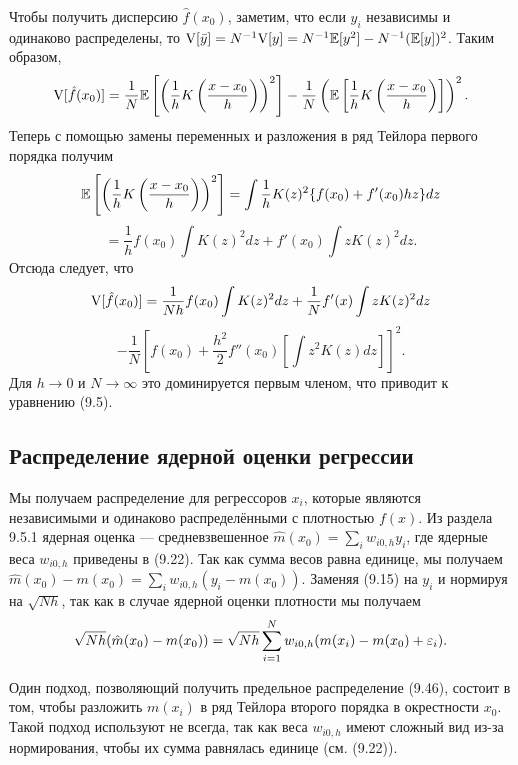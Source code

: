 Чтобы получить дисперсию $\hat{f}(x_0)$, заметим, что если $y_i$ независимы и одинаково распределены, то $\mathrm{V}[\bar{y}] = N^{-1}\mathrm{V}[y] = N^{-1}\mathbb{E}[y^2] - N^{-1}(\mathbb{E}[y])^2$. Таким образом,
\[
\mathrm{V}[\hat{f}(x_0)] = \frac{1}{N} \mathbb{E}\left[ \left( \frac{1}{h} K \left( \frac{x - x_0}{h} \right) \right)^2 \right] - \frac{1}{N} \left( \mathbb{E} \left[ \frac{1}{h} K \left( \frac{x - x_0}{h} \right) \right] \right)^2.
\]
Теперь с помощью замены переменных и разложения в ряд Тейлора первого порядка получим
\[
\mathbb{E}\left[ \left( \frac{1}{h} K \left( \frac{x - x_0}{h} \right) \right)^2 \right] = \int \frac{1}{h} K(z)^2 \{f(x_0) + f'(x_0)hz\}dz
\]
\[
= \frac{1}{h}f(x_0)\int K(z)^2dz + f'(x_0)\int zK(z)^2dz.
\]
Отсюда следует, что 
\[
\mathrm{V}[\hat{f}(x_0)] = \frac{1}{Nh} f(x_0) \int K(z)^2 dz + \frac{1}{N} f'(x) \int zK(z)^2dz
\]
\[
- \frac{1}{N} \left[f(x_0) + \frac{h^2}{2} f''(x_0)\left[ \int z^2 K(z)dz\right]\right]^2.
\]
Для $h \rightarrow 0$ и $N \rightarrow \infty$ это доминируется первым членом, что приводит к уравнению (9.5).

\subsection{Распределение ядерной оценки регрессии}

Мы получаем распределение для регрессоров $x_i$, которые являются независимыми и одинаково распределёнными с плотностью $f(x)$. Из раздела 9.5.1 ядерная оценка --- средневзвешенное $\hat{m}(x_0) = \sum_i w_{i0,h}y_i$, где ядерные веса $w_{i0,h}$ приведены в (9.22). Так как сумма весов равна единице, мы получаем $\hat{m}(x_0) - m(x_0) = \sum_i w_{i0,h}(y_i - m(x_0))$. Заменяя (9.15) на $y_i$ и нормируя на $\sqrt{Nh}$, так как в случае ядерной оценки плотности мы получаем
\begin{equation}
\sqrt{Nh}(\hat{m}(x_0) - m(x_0)) = \sqrt{Nh} \sum_{i=1}^N w_{i0,h}(m(x_i) - m(x_0) + \varepsilon_i).
\end{equation}

Один подход, позволяющий получить предельное распределение (9.46), состоит в том, чтобы разложить $m(x_i)$ в ряд Тейлора второго порядка в окрестности $x_0$. Такой подход используют не всегда, так как веса $w_{i0,h}$ имеют сложный вид из-за нормирования, чтобы их сумма равнялась единице (см. (9.22)).

